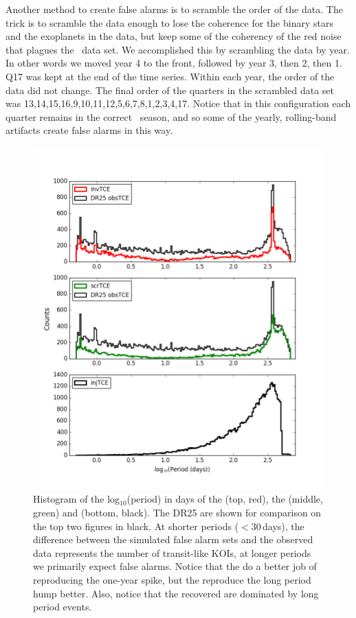 Another method to create false alarms is to scramble the order of the data.  The trick is to scramble the data enough to lose the coherence for the binary stars and the exoplanets in the data, but keep some of the coherency of the red noise that plagues the \Kepler\ data set.  We accomplished this by scrambling the data by year. In other words we moved year 4 to the front, followed by year 3, then 2, then 1. Q17 was kept at the end of the time series. Within each year, the order of the data did not change. The final order of the quarters in the scrambled data set was 13,14,15,16,9,10,11,12,5,6,7,8,1,2,3,4,17.  Notice that in this configuration each quarter remains in the correct \Kepler\ season, and so some of the yearly, rolling-band artifacts \citep{KIH} create false alarms in this way.

\begin{figure}[h!]
 \begin{center}
  \includegraphics[width=1.0\linewidth]{fig-simulTcePeriods.png}
  \caption{Histogram of the log$_{10}$(period) in days of the  (top, red), the  (middle, green) and  (bottom, black). The DR25  are shown for comparison on the top two figures in black.  At shorter periods ($< 30$\,days), the difference between the simulated false alarm sets and the observed data represents the number of transit-like KOIs, at longer periods we primarily expect false alarms.  Notice that the  do a better job of reproducing the one-year spike, but the  reproduce the long period hump better. Also, notice that the recovered  are dominated by long period events. }
  \label{f:simtces} 
 \end{center}
 \end{figure}

